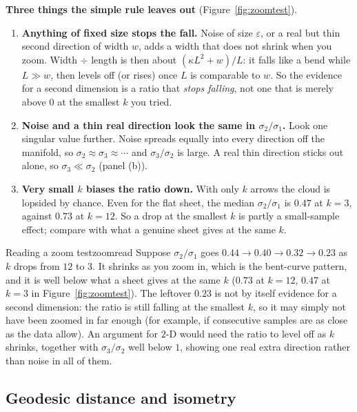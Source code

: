 \documentclass[11pt]{article}
\begin{document}
\begin{careful}
\textbf{Three things the simple rule leaves out} (Figure~\ref{fig:zoomtest}).
\begin{enumerate}[nosep,label=\arabic*)]
\item \textbf{Anything of fixed size stops the fall.} Noise of size $\varepsilon$, or a real but thin second direction of width $w$, adds a
width that does not shrink when you zoom. Width $\div$ length is then about $(\kappa L^2+w)/L$: it falls like a bend while $L\gg w$,
then levels off (or rises) once $L$ is comparable to $w$. So the evidence for a second dimension is a ratio that \emph{stops falling},
not one that is merely above $0$ at the smallest $k$ you tried.
\item \textbf{Noise and a thin real direction look the same in $\sigma_2/\sigma_1$.} Look one singular value further. Noise spreads
equally into every direction off the manifold, so $\sigma_2\approx\sigma_3\approx\cdots$ and $\sigma_3/\sigma_2$ is large. A real thin direction sticks
out alone, so $\sigma_3\ll\sigma_2$ (panel (b)).
\item \textbf{Very small $k$ biases the ratio down.} With only $k$ arrows the cloud is lopsided by chance. Even for the flat sheet,
the median $\sigma_2/\sigma_1$ is $0.47$ at $k=3$, against $0.73$ at $k=12$. So a drop at the smallest $k$ is partly a small-sample effect; compare
with what a genuine sheet gives at the same $k$.
\end{enumerate}
\end{careful}

\begin{example}{Reading a zoom test}{zoomread}
Suppose $\sigma_2/\sigma_1$ goes $0.44\to0.40\to0.32\to0.23$ as $k$ drops from $12$ to $3$. It shrinks as you zoom in, which is the bent-curve pattern,
and it is well below what a sheet gives at the same $k$ ($0.73$ at $k=12$, $0.47$ at $k=3$ in Figure~\ref{fig:zoomtest}). The leftover $0.23$ is not by
itself evidence for a second dimension: the ratio is still falling at the smallest $k$, so it may simply not have been zoomed in far
enough (for example, if consecutive samples are as close as the data allow). An argument for $2$-D would need the ratio to level
off as $k$ shrinks, together with $\sigma_3/\sigma_2$ well below $1$, showing one real extra direction rather than noise in all of them.
\end{example}

\subsection{Geodesic distance and isometry}
\end{document}
